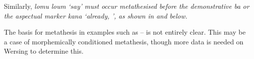 Similarly, \it{lomu} {\ra} \it{loum} `say' must occur
metathesised before the demonstrative \it{ba}
or the aspectual marker \it{kana} `already, ',
as shown in  and  below.

\begin{multicols}{2}
\let\eachwordone=\itshape
	\begin{exe}
		\label{ex:loum1}
	\end{exe}
\end{multicols}
\begin{multicols}{2}
\let\eachwordone=\itshape
	\begin{exe}		
		\label{ex:loum2}
	\end{exe}
\end{multicols}

The basis for metathesis in examples such as
-- is not entirely clear.
This may be a case of morphemically conditioned metathesis,
though more data is needed on Wersing to determine this.